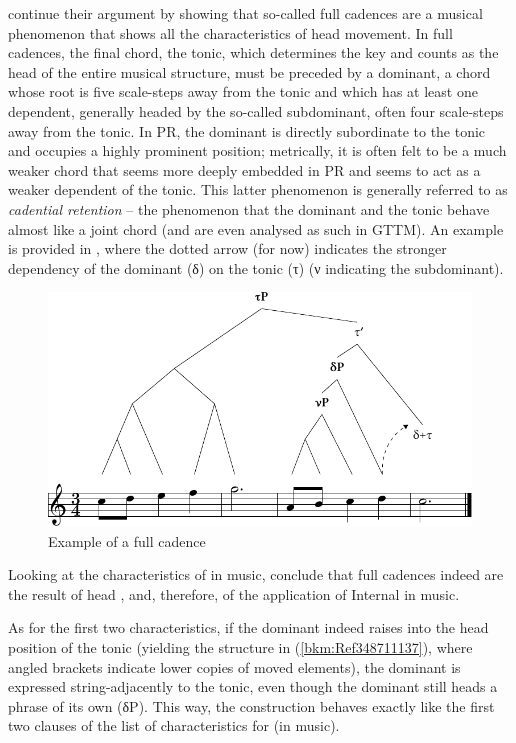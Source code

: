 \documentclass[output=paper]{langsci/langscibook}
\begin{document}
\citeauthor{KatzPes2011} continue their argument by showing that so-called full
cadences are a musical phenomenon that shows all the characteristics of head
movement. In full cadences, the final chord, the tonic, which determines the
key and counts as the head of the entire musical structure, must be preceded by
a dominant, a chord whose root is five scale-steps away from the tonic and
which has at least one dependent, generally headed by the so-called
subdominant, often four scale-steps away from the tonic. In \gls{PR}, the
dominant is directly subordinate to the tonic and occupies a highly prominent
position; metrically, it is often felt to be a much weaker chord that seems
more deeply embedded in \gls{PR} and seems to act as a weaker dependent of the
tonic. This latter phenomenon is generally referred to as \emph{cadential
retention} – the phenomenon that the dominant and the tonic behave almost like
a joint chord (and are even analysed as such in GTTM). An example is provided
in , where the dotted arrow (for now) indicates
the stronger dependency of the dominant (δ) on the tonic (τ) (ν indicating the
subdominant).

\begin{figure}
    \caption{\label{bkm:Ref348897627}Example of a full cadence \parencite[44]{KatzPes2011}}
    \includegraphics[width=\textwidth]{./img/28-12.pdf}
\end{figure}

Looking at the characteristics of  in music,
\citeauthor{KatzPes2011} conclude that full cadences indeed are the result of
head , and, therefore, of the application of Internal  in
music.

As for the first two characteristics, if the dominant indeed raises into the
head position of the tonic (yielding the structure in (\ref{bkm:Ref348711137}),
where angled brackets indicate lower copies of moved elements), the dominant is
expressed string-adjacently to the tonic, even though the dominant still heads
a phrase of its own (δP). This way, the construction behaves exactly like the
first two clauses of the list of characteristics for  (in music).
\end{document}
